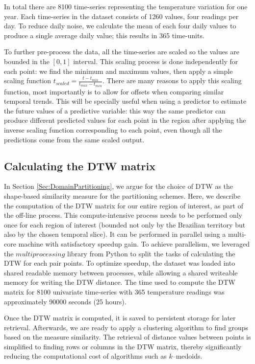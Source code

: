 In total there are 8100 time-series representing the temperature variation for one year. Each time-series in the dataset consists of 1260 values, four readings per day. To reduce daily noise, we calculate the mean of each four daily values to produce a single average daily value; this results in 365 time-units. 

To further pre-process the data, all the time-series are scaled so the values are bounded in the $[0, 1]$ interval. This scaling process is done independently for each point: we find the minimum and maximum values, then apply a simple scaling function $ t_{scaled} = \frac{t - t_{min}}{t_{max} - t_{min}}$. There are many reasons to apply this scaling function, most importantly is to allow for offsets when comparing similar temporal trends. This will be specially useful when using a predictor to estimate the future values of a predictive variable: this way the same predictor can produce different predicted values for each point in the region after applying the inverse scaling function corresponding to each point, even though all the predictions come from the same scaled output.

\subsection{Calculating the DTW matrix}

In Section \ref{Sec:DomainPartitioning}, we argue for the choice of DTW as the shape-based similarity measure for the partitioning schemes. Here, we describe the computation of the DTW matrix for our entire region of interest, as part of the off-line process. This compute-intensive process needs to be performed only once for each region of interest (bounded not only by the Brazilian territory but also by the chosen temporal slice). It can be performed in parallel using a multi-core machine with satisfactory speedup gain. To achieve parallelism, we leveraged the $multiprocessing$ library from Python to split the tasks of calculating the DTW for each pair points. To optimize speedup, the dataset was loaded into shared readable memory between processes, while allowing a shared writeable memory for writing the DTW distance. The time used to compute the DTW matrix for 8100 univariate time-series with 365 temperature readings was approximately 90000 seconds (25 hours).

Once the DTW matrix is computed, it is saved to persistent storage for later retrieval. Afterwards, we are ready to apply a clustering algorithm to find groups based on the measure similarity. The retrieval of distance values between points is simplified to finding rows or columns in the DTW matrix, thereby significantly reducing the computational cost of algorithms such as $k$--medoids.

